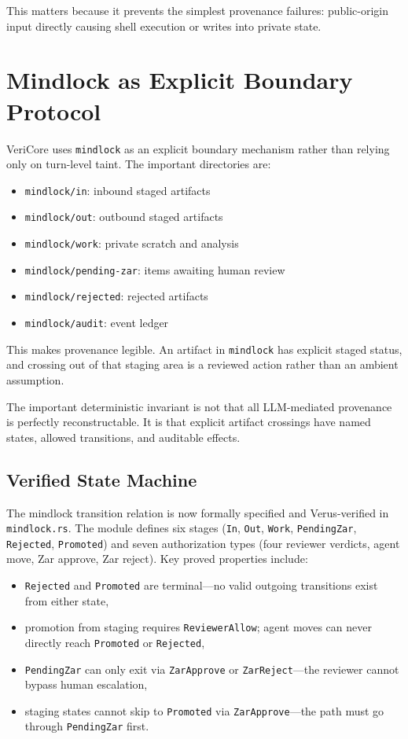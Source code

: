 \documentclass[11pt]{article}
\begin{document}
This matters because it prevents the simplest provenance failures: public-origin input directly causing shell execution or writes into private state.

\section{Mindlock as Explicit Boundary Protocol}
VeriCore uses \texttt{mindlock} as an explicit boundary mechanism rather than relying only on turn-level taint. The important directories are:
\begin{itemize}[leftmargin=1.5em]
\item \texttt{mindlock/in}: inbound staged artifacts
\item \texttt{mindlock/out}: outbound staged artifacts
\item \texttt{mindlock/work}: private scratch and analysis
\item \texttt{mindlock/pending-zar}: items awaiting human review
\item \texttt{mindlock/rejected}: rejected artifacts
\item \texttt{mindlock/audit}: event ledger
\end{itemize}

This makes provenance legible. An artifact in \texttt{mindlock} has explicit staged status, and crossing out of that staging area is a reviewed action rather than an ambient assumption.

The important deterministic invariant is not that all LLM-mediated provenance is perfectly reconstructable. It is that explicit artifact crossings have named states, allowed transitions, and auditable effects.

\subsection{Verified State Machine}
The mindlock transition relation is now formally specified and Verus-verified in \texttt{mindlock.rs}. The module defines six stages (\texttt{In}, \texttt{Out}, \texttt{Work}, \texttt{PendingZar}, \texttt{Rejected}, \texttt{Promoted}) and seven authorization types (four reviewer verdicts, agent move, Zar approve, Zar reject). Key proved properties include:
\begin{itemize}[leftmargin=1.5em]
\item \texttt{Rejected} and \texttt{Promoted} are terminal---no valid outgoing transitions exist from either state,
\item promotion from staging requires \texttt{ReviewerAllow}; agent moves can never directly reach \texttt{Promoted} or \texttt{Rejected},
\item \texttt{PendingZar} can only exit via \texttt{ZarApprove} or \texttt{ZarReject}---the reviewer cannot bypass human escalation,
\item staging states cannot skip to \texttt{Promoted} via \texttt{ZarApprove}---the path must go through \texttt{PendingZar} first.
\end{itemize}
\end{document}
